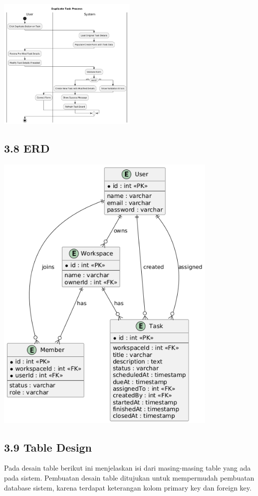 \begin{center}
    \includegraphics[width=0.5\textwidth]{assets/activity_diagrams/task_duplicate.png}
\end{center}

\subsection*{3.8 ERD}
\begin{center}
  \includegraphics[width=0.8\textwidth]{assets/erd.png}
\end{center}


\subsection*{3.9 Table Design}
Pada desain table berikut ini menjelaskan isi dari masing-masing table yang ada pada sistem. 
Pembuatan desain table ditujukan untuk mempermudah pembuatan database sistem, karena terdapat keterangan kolom primary key dan foreign key.

